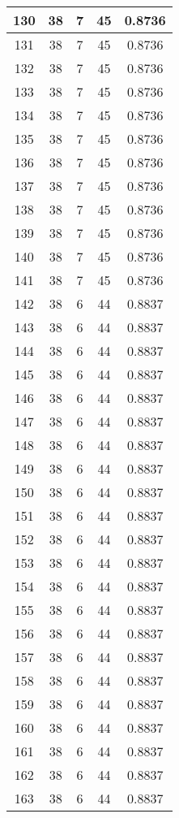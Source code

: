 \documentclass[letterpaper, 12pt]{article}
\begin{document}
\begin{longtable}{|c|c|c|c|c|}
\hline
130 & 38 & 7 & 45 & 0.8736 \\
\hline
131 & 38 & 7 & 45 & 0.8736 \\
\hline
132 & 38 & 7 & 45 & 0.8736 \\
\hline
133 & 38 & 7 & 45 & 0.8736 \\
\hline
134 & 38 & 7 & 45 & 0.8736 \\
\hline
135 & 38 & 7 & 45 & 0.8736 \\
\hline
136 & 38 & 7 & 45 & 0.8736 \\
\hline
137 & 38 & 7 & 45 & 0.8736 \\
\hline
138 & 38 & 7 & 45 & 0.8736 \\
\hline
139 & 38 & 7 & 45 & 0.8736 \\
\hline
140 & 38 & 7 & 45 & 0.8736 \\
\hline
141 & 38 & 7 & 45 & 0.8736 \\
\hline
142 & 38 & 6 & 44 & 0.8837 \\
\hline
143 & 38 & 6 & 44 & 0.8837 \\
\hline
144 & 38 & 6 & 44 & 0.8837 \\
\hline
145 & 38 & 6 & 44 & 0.8837 \\
\hline
146 & 38 & 6 & 44 & 0.8837 \\
\hline
147 & 38 & 6 & 44 & 0.8837 \\
\hline
148 & 38 & 6 & 44 & 0.8837 \\
\hline
149 & 38 & 6 & 44 & 0.8837 \\
\hline
150 & 38 & 6 & 44 & 0.8837 \\
\hline
151 & 38 & 6 & 44 & 0.8837 \\
\hline
152 & 38 & 6 & 44 & 0.8837 \\
\hline
153 & 38 & 6 & 44 & 0.8837 \\
\hline
154 & 38 & 6 & 44 & 0.8837 \\
\hline
155 & 38 & 6 & 44 & 0.8837 \\
\hline
156 & 38 & 6 & 44 & 0.8837 \\
\hline
157 & 38 & 6 & 44 & 0.8837 \\
\hline
158 & 38 & 6 & 44 & 0.8837 \\
\hline
159 & 38 & 6 & 44 & 0.8837 \\
\hline
160 & 38 & 6 & 44 & 0.8837 \\
\hline
161 & 38 & 6 & 44 & 0.8837 \\
\hline
162 & 38 & 6 & 44 & 0.8837 \\
\hline
163 & 38 & 6 & 44 & 0.8837 \\

\end{longtable}
\end{document}
